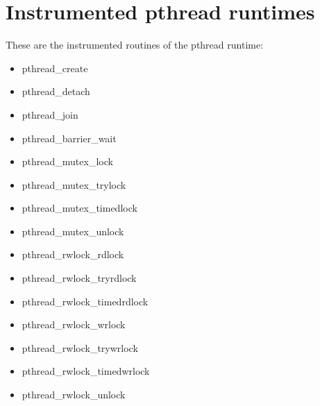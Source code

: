 \section{Instrumented pthread runtimes}\label{sec:OpenMPruntimesinstrumented}

These are the instrumented routines of the pthread runtime:

\begin{itemize}
\item pthread\_create
\item pthread\_detach
\item pthread\_join
\item pthread\_barrier\_wait
\item pthread\_mutex\_lock
\item pthread\_mutex\_trylock
\item pthread\_mutex\_timedlock
\item pthread\_mutex\_unlock
\item pthread\_rwlock\_rdlock
\item pthread\_rwlock\_tryrdlock
\item pthread\_rwlock\_timedrdlock
\item pthread\_rwlock\_wrlock
\item pthread\_rwlock\_trywrlock
\item pthread\_rwlock\_timedwrlock
\item pthread\_rwlock\_unlock
\end{itemize}
